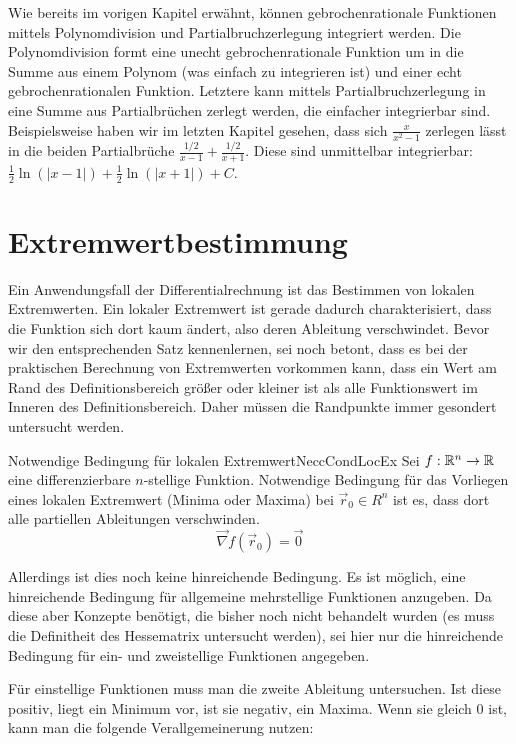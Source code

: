 Wie bereits im vorigen Kapitel erwähnt, können gebrochenrationale Funktionen mittels Polynomdivision und Partialbruchzerlegung integriert werden. Die Polynomdivision formt eine unecht gebrochenrationale Funktion um in die Summe aus einem Polynom (was einfach zu integrieren ist) und einer echt gebrochenrationalen Funktion. Letztere kann mittels Partialbruchzerlegung in eine Summe aus Partialbrüchen zerlegt werden, die einfacher integrierbar sind. Beispielsweise haben wir im letzten Kapitel gesehen, dass sich $\frac{x}{x^2-1}$ zerlegen lässt in die beiden Partialbrüche $\frac{1/2}{x-1} + \frac{1/2}{x+1}$. Diese sind unmittelbar integrierbar: $\frac{1}{2}\ln(|x-1|) + \frac{1}{2} \ln(|x+1|) + C$.

\section{Extremwertbestimmung}

Ein Anwendungsfall der Differentialrechnung ist das Bestimmen von lokalen Extremwerten. Ein lokaler Extremwert ist gerade dadurch charakterisiert, dass die Funktion sich dort kaum ändert, also deren Ableitung verschwindet. Bevor wir den entsprechenden Satz kennenlernen, sei noch betont, dass es bei der praktischen Berechnung von Extremwerten vorkommen kann, dass ein Wert am Rand des Definitionsbereich größer oder kleiner ist als alle Funktionswert im Inneren des Definitionsbereich. Daher müssen die Randpunkte immer gesondert untersucht werden.

\begin{statement}{Notwendige Bedingung für lokalen Extremwert}{NeccCondLocEx}
    Sei $f: \mathbb{R}^n \to \mathbb{R}$ eine differenzierbare $n$-stellige Funktion. Notwendige Bedingung für das Vorliegen eines lokalen Extremwert (Minima oder Maxima) bei $\vec r_0 \in R^n$ ist es, dass dort alle partiellen Ableitungen verschwinden.
    $$
        \vec\nabla f(\vec r_0) = \vec 0
    $$
\end{statement}

Allerdings ist dies noch keine hinreichende Bedingung. Es ist möglich, eine hinreichende Bedingung für allgemeine mehrstellige Funktionen anzugeben. Da diese aber Konzepte benötigt, die bisher noch nicht behandelt wurden (es muss die Definitheit des Hessematrix untersucht werden), sei hier nur die hinreichende Bedingung für ein- und zweistellige Funktionen angegeben.

Für einstellige Funktionen muss man die zweite Ableitung untersuchen. Ist diese positiv, liegt ein Minimum vor, ist sie negativ, ein Maxima. Wenn sie gleich $0$ ist, kann man die folgende Verallgemeinerung nutzen:

